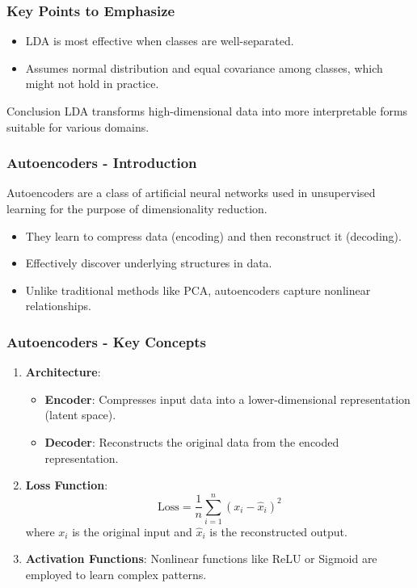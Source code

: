 \documentclass[aspectratio=169]{beamer}
\begin{document}
\begin{frame}[fragile]
    \frametitle{Key Points to Emphasize}
    \begin{itemize}
        \item LDA is most effective when classes are well-separated.
        \item Assumes normal distribution and equal covariance among classes, which might not hold in practice.
    \end{itemize}
    \begin{block}{Conclusion}
        LDA transforms high-dimensional data into more interpretable forms suitable for various domains.
    \end{block}
\end{frame}

\begin{frame}[fragile]
    \frametitle{Autoencoders - Introduction}
    Autoencoders are a class of artificial neural networks used in unsupervised learning for the purpose of dimensionality reduction. 
    \begin{itemize}
        \item They learn to compress data (encoding) and then reconstruct it (decoding).
        \item Effectively discover underlying structures in data.
        \item Unlike traditional methods like PCA, autoencoders capture nonlinear relationships.
    \end{itemize}
\end{frame}

\begin{frame}[fragile]
    \frametitle{Autoencoders - Key Concepts}
    \begin{enumerate}
        \item \textbf{Architecture}:
        \begin{itemize}
            \item \textbf{Encoder}: Compresses input data into a lower-dimensional representation (latent space).
            \item \textbf{Decoder}: Reconstructs the original data from the encoded representation.
        \end{itemize}
        
        \item \textbf{Loss Function}:
        \begin{equation}
            \text{Loss} = \frac{1}{n} \sum_{i=1}^{n} (x_i - \hat{x}_i)^2
        \end{equation}
        where \( x_i \) is the original input and \( \hat{x}_i \) is the reconstructed output.

        \item \textbf{Activation Functions}:
        Nonlinear functions like ReLU or Sigmoid are employed to learn complex patterns.
    \end{enumerate}
\end{frame}
\end{document}
